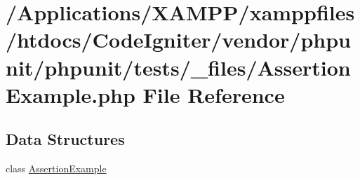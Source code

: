 \hypertarget{_assertion_example_8php}{}\section{/\+Applications/\+X\+A\+M\+P\+P/xamppfiles/htdocs/\+Code\+Igniter/vendor/phpunit/phpunit/tests/\+\_\+files/\+Assertion\+Example.php File Reference}
\label{_assertion_example_8php}
\subsection*{Data Structures}
\begin{DoxyCompactItemize}
\item 
class \mbox{\hyperlink{class_assertion_example}{Assertion\+Example}}
\end{DoxyCompactItemize}
